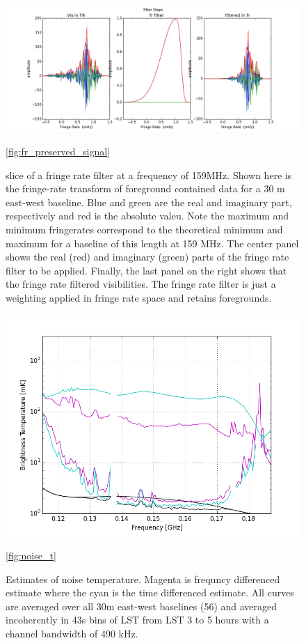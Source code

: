 \documentclass[twocolumn,numberedappendix]{emulateapj}
\begin{document}
\begin{figure}[t!]\centering
\includegraphics[width=2\columnwidth]{plots/fr_preserved_signal.png}
\caption{slice of a fringe rate filter at a frequency of 159MHz. Shown here is
the fringe-rate transform of foreground contained data for a 30 m east-west
baseline. Blue and green are the real and imaginary part, respectively and red
is the absolute valeu. Note the maximum and minimum fringerates correspond to
the theoretical minimum and maximum for a baseline of this length at 159 MHz.
The center panel shows the real (red)  and imaginary (green) parts of the fringe
rate filter to be applied. Finally, the last panel on the right shows that the
fringe rate filtered visibilities. The fringe rate filter is just a weighting
applied in fringe rate space and retains foregrounds.}
\ref{fig:fr_preserved_signal}
\end{figure}

\begin{figure}[h!]\centering
\includegraphics[width=\columnwidth, height=.8\columnwidth]{plots/noise_t_35.png}
\caption{Estimates of noise temperature. Magenta is frequncy differenced
estimate where the cyan is the time differenced estimate. All curves are
averaged over all 30m east-west baselines (56) and averaged incoherently in 43s
bins of LST from LST 3 to 5 hours with a channel bandwidth of 490 kHz.}
\ref{fig:noise_t}
\end{figure}
\end{document}

